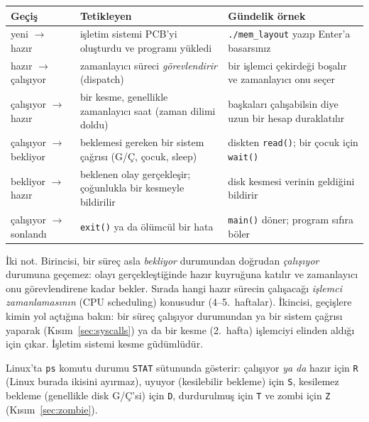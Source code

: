 \documentclass[11pt,a4paper]{article}
\newcommand{\cmd}[1]{\texttt{#1}}
\begin{document}
\begin{center}
\renewcommand{\arraystretch}{1.3}
\begin{tabularx}{\linewidth}{>{\raggedright\arraybackslash}p{3.2cm} >{\raggedright\arraybackslash}X >{\raggedright\arraybackslash}p{4.6cm}}
\toprule
\textbf{Geçiş} & \textbf{Tetikleyen} & \textbf{Gündelik örnek} \\
\midrule
yeni $\to$ hazır & işletim sistemi PCB'yi oluşturdu ve programı yükledi & \cmd{./mem\_layout} yazıp Enter'a basarsınız \\
hazır $\to$ çalışıyor & zamanlayıcı süreci \emph{görevlendirir} (dispatch) & bir işlemci çekirdeği boşalır ve zamanlayıcı onu seçer \\
çalışıyor $\to$ hazır & bir kesme, genellikle zamanlayıcı saat (zaman dilimi doldu) & başkaları çalışabilsin diye uzun bir hesap duraklatılır \\
çalışıyor $\to$ bekliyor & beklemesi gereken bir sistem çağrısı (G/Ç, çocuk, sleep) & diskten \cmd{read()}; bir çocuk için \cmd{wait()} \\
bekliyor $\to$ hazır & beklenen olay gerçekleşir; çoğunlukla bir kesmeyle bildirilir & disk kesmesi verinin geldiğini bildirir \\
çalışıyor $\to$ sonlandı & \cmd{exit()} ya da ölümcül bir hata & \cmd{main()} döner; program sıfıra böler \\
\bottomrule
\end{tabularx}
\end{center}

İki not. Birincisi, bir süreç asla \emph{bekliyor} durumundan doğrudan \emph{çalışıyor} durumuna geçemez: olayı gerçekleştiğinde hazır kuyruğuna katılır ve zamanlayıcı onu görevlendirene kadar bekler. Sırada hangi hazır sürecin çalışacağı \emph{işlemci zamanlamasının} (CPU scheduling) konusudur (4--5.~haftalar). İkincisi, geçişlere kimin yol açtığına bakın: bir süreç çalışıyor durumundan ya bir sistem çağrısı yaparak (Kısım~\ref{sec:syscalls}) ya da bir kesme (2.~hafta) işlemciyi elinden aldığı için çıkar. İşletim sistemi kesme güdümlüdür.

Linux'ta \cmd{ps} komutu durumu \texttt{STAT} sütununda gösterir: çalışıyor \emph{ya da} hazır için \texttt{R} (Linux burada ikisini ayırmaz), uyuyor (kesilebilir bekleme) için \texttt{S}, kesilemez bekleme (genellikle disk G/Ç'si) için \texttt{D}, durdurulmuş için \texttt{T} ve zombi için \texttt{Z} (Kısım~\ref{sec:zombie}).
\end{document}
